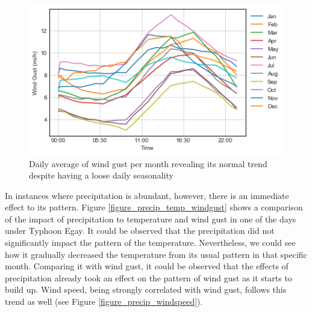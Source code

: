 \begin{figure}
  \includegraphics[width=\linewidth]{figures/figure_windgust.png}
  \caption{Daily average of wind gust per month revealing its normal trend despite having a loose daily seasonality}
  \label{figure_windgust}
\end{figure}





In instances where precipitation is abundant, however, there is an immediate effect to its pattern. Figure \ref{figure_precip_temp_windgust} shows a comparison of the impact of precipitation to temperature and wind gust in one of the days under Typhoon Egay. It could be observed that the precipitation did not significantly impact the pattern of the temperature. Nevertheless, we could see how it gradually decreased the temperature from its usual pattern in that specific month. Comparing it with wind gust, it could be observed that the effects of precipitation already took an effect on the pattern of wind gust as it starts to build up. Wind speed, being strongly correlated with wind gust, follows this trend as well (see Figure \ref{figure_precip_windspeed}).








